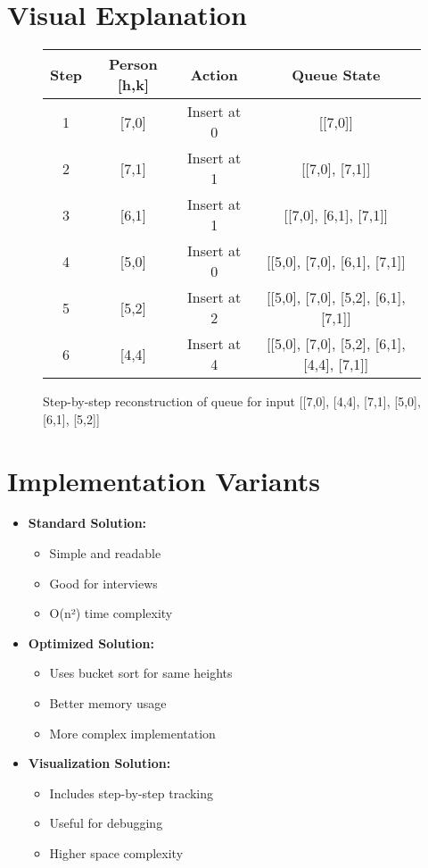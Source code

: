 \section*{Visual Explanation}
\begin{figure}[h]
    \centering
    \begin{tabular}{|c|c|c|c|}
        \hline
        Step & Person [h,k] & Action & Queue State \\
        \hline
        1 & [7,0] & Insert at 0 & [[7,0]] \\
        2 & [7,1] & Insert at 1 & [[7,0], [7,1]] \\
        3 & [6,1] & Insert at 1 & [[7,0], [6,1], [7,1]] \\
        4 & [5,0] & Insert at 0 & [[5,0], [7,0], [6,1], [7,1]] \\
        5 & [5,2] & Insert at 2 & [[5,0], [7,0], [5,2], [6,1], [7,1]] \\
        6 & [4,4] & Insert at 4 & [[5,0], [7,0], [5,2], [6,1], [4,4], [7,1]] \\
        \hline
    \end{tabular}
    \caption{Step-by-step reconstruction of queue for input [[7,0], [4,4], [7,1], [5,0], [6,1], [5,2]]}
    \label{fig:queue_reconstruction}
\end{figure}

\section*{Implementation Variants}
\begin{itemize}
    \item \textbf{Standard Solution:}
        \begin{itemize}
            \item Simple and readable
            \item Good for interviews
            \item O(n²) time complexity
        \end{itemize}
    \item \textbf{Optimized Solution:}
        \begin{itemize}
            \item Uses bucket sort for same heights
            \item Better memory usage
            \item More complex implementation
        \end{itemize}
    \item \textbf{Visualization Solution:}
        \begin{itemize}
            \item Includes step-by-step tracking
            \item Useful for debugging
            \item Higher space complexity
        \end{itemize}
\end{itemize}


